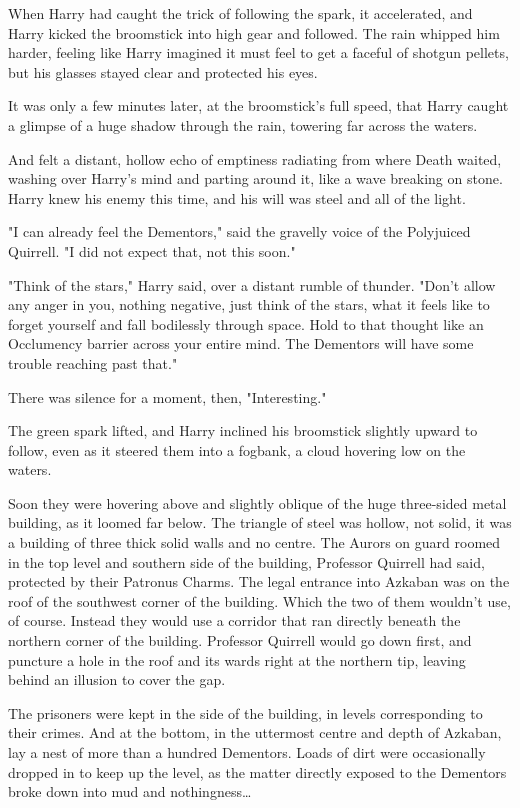 When Harry had caught the trick of following the spark, it accelerated, and
Harry kicked the broomstick into high gear and followed. The rain whipped him
harder, feeling like Harry imagined it must feel to get a faceful of shotgun
pellets, but his glasses stayed clear and protected his eyes.

It was only a few minutes later, at the broomstick's full speed, that Harry
caught a glimpse of a huge shadow through the rain, towering far across the
waters.

And felt a distant, hollow echo of emptiness radiating from where Death waited,
washing over Harry's mind and parting around it, like a wave breaking on stone.
Harry knew his enemy this time, and his will was steel and all of the light.

"I can already feel the Dementors," said the gravelly voice of the Polyjuiced
Quirrell. "I did not expect that, not this soon."

"Think of the stars," Harry said, over a distant rumble of thunder. "Don't
allow any anger in you, nothing negative, just think of the stars, what it
feels like to forget yourself and fall bodilessly through space. Hold to that
thought like an Occlumency barrier across your entire mind. The Dementors will
have some trouble reaching past that."

There was silence for a moment, then, "Interesting."

The green spark lifted, and Harry inclined his broomstick slightly upward to
follow, even as it steered them into a fogbank, a cloud hovering low on the
waters.

Soon they were hovering above and slightly oblique of the huge three-sided
metal building, as it loomed far below. The triangle of steel was hollow, not
solid, it was a building of three thick solid walls and no centre. The Aurors
on guard roomed in the top level and southern side of the building, Professor
Quirrell had said, protected by their Patronus Charms. The legal entrance into
Azkaban was on the roof of the southwest corner of the building. Which the two
of them wouldn't use, of course. Instead they would use a corridor that ran
directly beneath the northern corner of the building. Professor Quirrell would
go down first, and puncture a hole in the roof and its wards right at the
northern tip, leaving behind an illusion to cover the gap.

The prisoners were kept in the side of the building, in levels corresponding to
their crimes. And at the bottom, in the uttermost centre and depth of Azkaban,
lay a nest of more than a hundred Dementors. Loads of dirt were occasionally
dropped in to keep up the level, as the matter directly exposed to the
Dementors broke down into mud and nothingness{\ldots}

